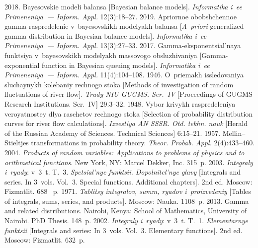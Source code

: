   \begin{multicols}{2}

\renewcommand{\bibname}{\protect\rmfamily References}

{\small\frenchspacing
 {%
 \begin{thebibliography}{99}
2018. Bayesovskie modeli balansa [Bayesian balance models]. 
\textit{Informatika i~ee Primeneniya~--- Inform. Appl.} 12(3):18--27.
 2019. Apriornoe obobshchennoe gamma-raspredelenie 
v~bayesovskikh modelyakh balansa [\textit{A~priori} generalized gamma distribution in 
Bayesian balance models]. \textit{Informatika i~ee Primeneniya~--- Inform. Appl.} 13(3):27--33.
 2017. Gamma-eksponentsial'naya funktsiya v~bayesovskikh modelyakh massovogo obsluzhivaniya 
 [Gamma-exponential function in Bayesian queuing models]. 
 \textit{Informatika i~ee Primeneniya~--- Inform. Appl.} 11(4):104--108.
 1946. 
O~priemakh issledovaniya sluchaynykh kolebaniy rechnogo stoka 
[Methods of investigation of random fluctuations of river flow].
\textit{Trudy NIU GUGMS. Ser.~IV} [Proceedings of GUGMS Research Institutions. Ser.~IV] 29:3--32.
 1948. 
Vybor krivykh raspredeleniya veroyatnostey dlya raschetov rechnogo stoka 
[Selection of probability distribution curves for river flow calculations]. 
\textit{Izvestiya AN SSSR. Otd. tekhn. nauk}
 [Herald of the Russian Academy of Sciences. Technical Sciences] 6:15--21.
 1957. 
Mellin--Stieltjes transformations in probability theory. \textit{Theor. Probab. Appl.} 2(4):433--460.
 2004. 
\textit{Products of random variables: Applications to problems of physics and to arithmetical functions}. 
New York, NY: Marcel Dekker, Inc. 315~p.
 2003. \textit{Integraly i~ryady}: v~3~t. T.~3. 
 \textit{Spetsial'nye funktsii. Dopolnitel'nye glavy} [Integrals and series. In 3~vols. Vol.~3. 
 Special functions. Additional chapters]. 2nd ed. Moscow: Fizmatlit. 688~ p.
 1971. \textit{Tablitsy integralov, summ, ryadov i~proizvedeniy} 
 [Tables of integrals, sums, series, and products]. Moscow: Nauka. 1108~p.
 2013. Gamma and related distributions. 
Nairobi, Kenya: School of Mathematics, University of Nairobi. PhD Thesis. 148~p.
 2002. \textit{Integraly i~ryady}: v~3~t. T.~1. \textit{Elementarnye funktsii} 
 [Integrals and series: In 3~vols. Vol.~3. Elementary functions]. 2nd ed. Moscow: Fizmatlit. 632~p.
 \end{thebibliography}

 }
 }

\end{multicols}

